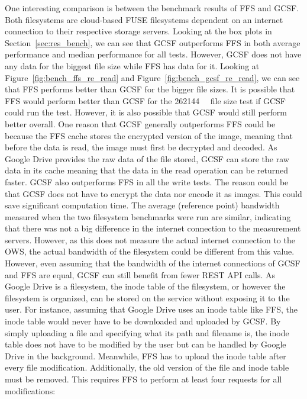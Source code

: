 One interesting comparison is between the benchmark results of \gls{FFS} and \gls{GCSF}. Both filesystems are \mbox{cloud-based} \gls{FUSE} filesystems dependent on an internet connection to their respective storage servers. Looking at the box plots in Section~\ref{sec:res_bench}, we can see that \gls{GCSF} outperforms \gls{FFS} in both average performance and median performance for all tests. However, \gls{GCSF} does not have any data for the biggest file size while \gls{FFS} has data for it. Looking at Figure~\ref{fig:bench_ffs_re_read} and Figure~\ref{fig:bench_gcsf_re_read}, we can see that \gls{FFS} performs better than \gls{GCSF} for the bigger file sizes. It is possible that \gls{FFS} would perform better than \gls{GCSF} for the \SI{262144}{\kilo\byte} file size test if \gls{GCSF} could run the test. However, it is also possible that \gls{GCSF} would still perform better overall. One reason that \gls{GCSF} generally outperforms \gls{FFS} could be because the \gls{FFS} cache stores the encrypted version of the image, meaning that before the data is read, the image must first be decrypted and decoded. As Google Drive provides the raw data of the file stored, \gls{GCSF} can store the raw data in its cache meaning that the data in the read operation can be returned faster. \gls{GCSF} also outperforms \gls{FFS} in all the write tests. The reason could be that \gls{GCSF} does not have to encrypt the data nor encode it as images. This could save significant computation time. The average (reference point) bandwidth measured when the two filesystem benchmarks were run are similar, indicating that there was not a big difference in the internet connection to the measurement servers. However, as this does not measure the actual internet connection to the \gls{OWS}, the actual bandwidth of the filesystem could be different from this value. However, even assuming that the bandwidth of the internet connections of \gls{GCSF} and \gls{FFS} are equal, \gls{GCSF} can still benefit from fewer REST \gls{API} calls. As Google Drive is a filesystem, the inode table of the filesystem, or however the filesystem is organized, can be stored on the service without exposing it to the user. For instance, assuming that Google Drive uses an inode table like \gls{FFS}, the inode table would never have to be downloaded and uploaded by \gls{GCSF}. By simply uploading a file and specifying what its path and filename is, the inode table does not have to be modified by the user but can be handled by Google Drive in the background. Meanwhile, \gls{FFS} has to upload the inode table after every file modification. Additionally, the old version of the file and inode table must be removed. This requires \gls{FFS} to perform at least four requests for all modifications:
